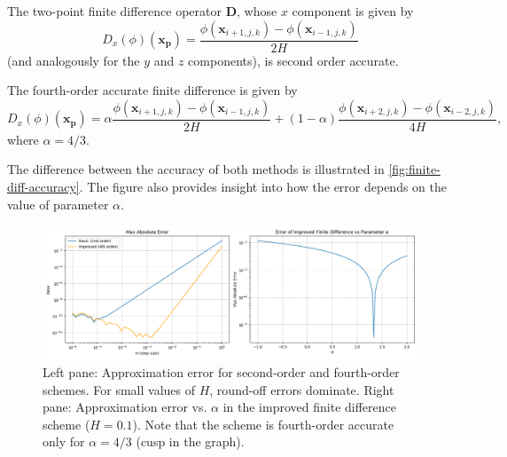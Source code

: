 The two-point finite difference operator $\mathbf{D}$, whose $x$ component is given by
\begin{equation*}
    D_x(\phi)(\mathbf{x_\mathbf{p}}) = \frac{\phi(\mathbf{x}_{i+1,j,k}) - \phi(\mathbf{x}_{i-1,j,k})}{2H}
\end{equation*}
(and analogously for the $y$ and $z$ components), is second order accurate.

The fourth-order accurate finite difference is given by
\begin{equation*}
    D_x(\phi)(\mathbf{x}_\mathbf{p}) = \alpha\frac{\phi(\mathbf{x}_{i+1,j,k}) - \phi(\mathbf{x}_{i-1,j,k})}{2H} + (1-\alpha)\frac{\phi(\mathbf{x}_{i+2,j,k}) - \phi(\mathbf{x}_{i-2,j,k})}{4H},
\end{equation*}
where $\alpha = 4/3$.

The difference between the accuracy of both methods is illustrated in \autoref{fig:finite-diff-accuracy}.
The figure also provides insight into how the error depends on the value of parameter $\alpha$.
\begin{figure}[htp]
    \centering
    \includegraphics[scale=0.43]{img/finite-diff/finite-difference.png}
    \caption{Left pane: Approximation error for second-order and fourth-order schemes.
        For small values of $H$, round-off errors dominate.
        Right pane: Approximation error vs. $\alpha$ in the improved finite difference scheme ($H = 0.1$).
        Note that the scheme is fourth-order accurate only for $\alpha = 4/3$ (cusp in the graph).}
    \label{fig:finite-diff-accuracy}
\end{figure}

